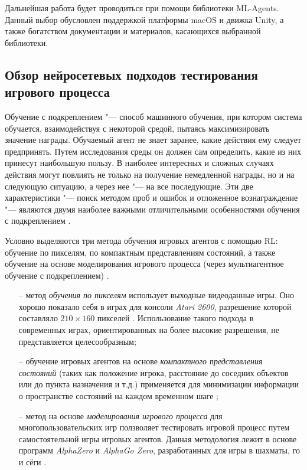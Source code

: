 Дальнейшая работа будет проводиться при помощи библиотеки ML-Agents. Данный выбор обусловлен поддержкой платформы macOS и движка Unity, а также богатством документации и материалов, касающихся выбранной библиотеки.

\subsection{Обзор нейросетевых подходов тестирования игрового процесса}
Обучение с подкреплением "--- способ машинного обучения, при котором система обучается, взаимодействуя с некоторой средой, пытаясь максимизировать значение награды. Обучаемый агент не знает заранее, какие действия ему следует предпринять. Путем исследования среды он должен сам определить, какие из них принесут наибольшую пользу. В наиболее интересных и сложных случаях действия могут повлиять не только на получение немедленной награды, но и на следующую ситуацию, а через нее "--- на все последующие. Эти две характеристики "--- поиск методом проб и ошибок и отложенное вознаграждение "--- являются двумя наиболее важными отличительными особенностями обучения с подкреплением \cite{sutton2018reinforcement}.

Условно выделяются три метода обучения игровых агентов с помощью RL: обучение по пикселям, по компактным представлениям состояний, а также обучение на основе моделирования игрового процесса (через мультиагентное обучение с подкреплением) \cite{politowski2021survey}.
\begin{itemize}
	\item[--] метод \textit{обучения по пикселям} использует выходные видеоданные игры. Оно хорошо показало себя в играх для консоли \textit{Atari 2600}, разрешение которой составляло \(210 \times 160\) пикселей \cite{mnih2013playing}. Использование такого подхода в современных играх, ориентированных на более высокие разрешения, не представляется целесообразным;
	\item[--] обучение игровых агентов на основе \textit{компактного представления состояний} (таких как положение игрока, расстояние до соседних объектов или до пункта назначения и т.д.) применяется для минимизации информации о пространстве состояний на каждом временном шаге \cite{borovikov2019winning};
	\item[--] метод на основе \textit{моделирования игрового процесса} для многопользовательских игр ползволяет тестировать игровой процесс путем самостоятельной игры игровых агентов. Данная методология лежит в основе программ \textit{AlphaZero} и \textit{AlphaGo Zero}, разработанных для игры в шахматы, го и сёги \cite{silver2017mastering}.
\end{itemize}

